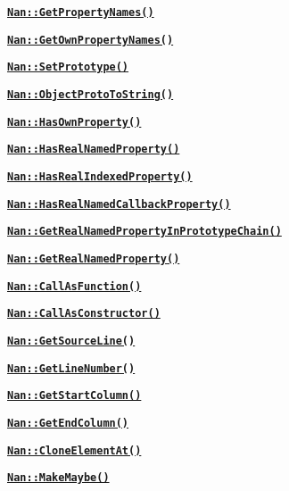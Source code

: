 \begin{DoxyItemize}
\begin{DoxyItemize}
\item \href{#api_nan_get_property_names}{\tt {\bfseries {\ttfamily Nan\+::\+Get\+Property\+Names()}}}
\item \href{#api_nan_get_own_property_names}{\tt {\bfseries {\ttfamily Nan\+::\+Get\+Own\+Property\+Names()}}}
\item \href{#api_nan_set_prototype}{\tt {\bfseries {\ttfamily Nan\+::\+Set\+Prototype()}}}
\item \href{#api_nan_object_proto_to_string}{\tt {\bfseries {\ttfamily Nan\+::\+Object\+Proto\+To\+String()}}}
\item \href{#api_nan_has_own_property}{\tt {\bfseries {\ttfamily Nan\+::\+Has\+Own\+Property()}}}
\item \href{#api_nan_has_real_named_property}{\tt {\bfseries {\ttfamily Nan\+::\+Has\+Real\+Named\+Property()}}}
\item \href{#api_nan_has_real_indexed_property}{\tt {\bfseries {\ttfamily Nan\+::\+Has\+Real\+Indexed\+Property()}}}
\item \href{#api_nan_has_real_named_callback_property}{\tt {\bfseries {\ttfamily Nan\+::\+Has\+Real\+Named\+Callback\+Property()}}}
\item \href{#api_nan_get_real_named_property_in_prototype_chain}{\tt {\bfseries {\ttfamily Nan\+::\+Get\+Real\+Named\+Property\+In\+Prototype\+Chain()}}}
\item \href{#api_nan_get_real_named_property}{\tt {\bfseries {\ttfamily Nan\+::\+Get\+Real\+Named\+Property()}}}
\item \href{#api_nan_call_as_function}{\tt {\bfseries {\ttfamily Nan\+::\+Call\+As\+Function()}}}
\item \href{#api_nan_call_as_constructor}{\tt {\bfseries {\ttfamily Nan\+::\+Call\+As\+Constructor()}}}
\item \href{#api_nan_get_source_line}{\tt {\bfseries {\ttfamily Nan\+::\+Get\+Source\+Line()}}}
\item \href{#api_nan_get_line_number}{\tt {\bfseries {\ttfamily Nan\+::\+Get\+Line\+Number()}}}
\item \href{#api_nan_get_start_column}{\tt {\bfseries {\ttfamily Nan\+::\+Get\+Start\+Column()}}}
\item \href{#api_nan_get_end_column}{\tt {\bfseries {\ttfamily Nan\+::\+Get\+End\+Column()}}}
\item \href{#api_nan_clone_element_at}{\tt {\bfseries {\ttfamily Nan\+::\+Clone\+Element\+At()}}}
\item \href{#api_nan_make_maybe}{\tt {\bfseries {\ttfamily Nan\+::\+Make\+Maybe()}}}
\end{DoxyItemize}
\end{DoxyItemize}

